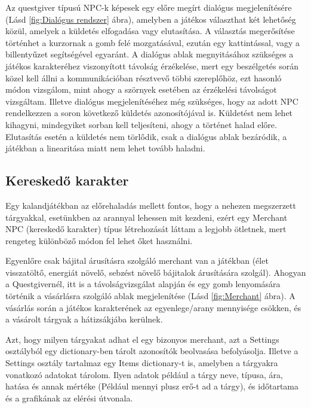 Az questgiver típusú NPC-k képesek egy előre megírt dialógus megjelenítésére (Lásd \ref{fig:Dialógus rendszer} ábra), amelyben a játékos választhat két lehetőség közül, amelyek a küldetés elfogadása vagy elutasítása. A választás megerősítése történhet a kurzornak a gomb felé mozgatásával, ezután egy kattintással, vagy a billentyűzet segítségével egyaránt. A dialógus ablak megnyitásához szükséges a játékos karakteréhez viszonyított távolság érzékelése, mert egy beszélgetés során közel kell állni a kommunikációban résztvevő többi szereplőhöz, ezt hasonló módon vizsgálom, mint ahogy a szörnyek esetében az érzékelési távolságot vizsgáltam. Illetve dialógus megjelenítéséhez még szükséges, hogy az adott NPC rendelkezzen a soron következő küldetés azonosítójával is. Küldetést nem lehet kihagyni, mindegyiket sorban kell teljesíteni,
ahogy a történet halad előre. Elutasítás esetén a küldetés nem törlődik, csak a dialógus ablak bezáródik, a játékban a linearitása miatt nem lehet tovább haladni.



\subsection{Kereskedő karakter}

 Egy kalandjátékban az előrehaladás mellett fontos, hogy a nehezen megszerzett tárgyakkal,
 esetünkben az arannyal lehessen mit kezdeni, ezért egy Merchant NPC (kereskedő karakter) típus létrehozását láttam a legjobb ötletnek,
  mert rengeteg különböző módon fel lehet őket használni. 

Egyenlőre csak bájital árusításra szolgáló merchant van a játékban (élet visszatöltő, energiát növelő, sebzést növelő bájitalok árusítására szolgál).
   Ahogyan a Questgivernél, itt is a távolságvizsgálat alapján és egy gomb lenyomására történik a vásárlásra szolgáló ablak megjelenítése (Lásd \ref{fig:Merchant} ábra).
     A vásárlás során a játékos karakterének az egyenlege/arany mennyisége csökken, és a vásárolt tárgyak a hátizsákjába kerülnek.

Azt, hogy milyen tárgyakat adhat el egy bizonyos merchant, azt a Settings osztályból egy dictionary-ben tárolt azonosítók beolvasása befolyásolja.
 Illetve a Settings osztály tartalmaz egy Items dictionary-t is, amelyben a tárgyakra vonatkozó adatokat tárolom.
  Ilyen adatok például a tárgy neve, típusa, ára, hatása és annak mértéke (Például mennyi plusz erő-t ad a tárgy),
   és időtartama és a grafikának az elérési útvonala.  

